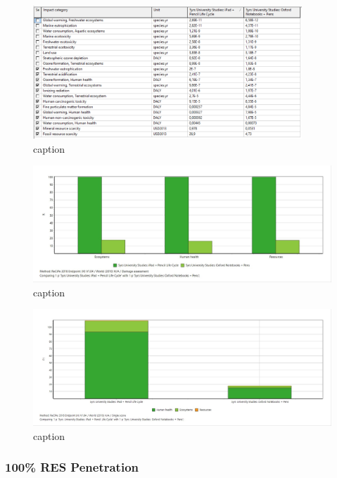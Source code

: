 \begin{figure}[H]
    \centering
    \includegraphics[width=0.9\textwidth]{images/RES_50/Characterization_Table_RES_50.PNG}
    \caption{caption}\label{fig:characterization_table_RES_50}
\end{figure}

\begin{figure}[H]
    \centering
    \includegraphics[width=\textwidth]{images/RES_50/Damage_Assessment_RES_50.JPG}
    \caption{caption}\label{fig:damage_assessment_RES_50}
\end{figure}

\begin{figure}[H]
    \centering
    \includegraphics[width=\textwidth]{images/RES_50/Single_Score_RES_50.JPG}
    \caption{caption}\label{fig:single_score_RES50}
\end{figure}

\subsubsection{100\% RES Penetration}

